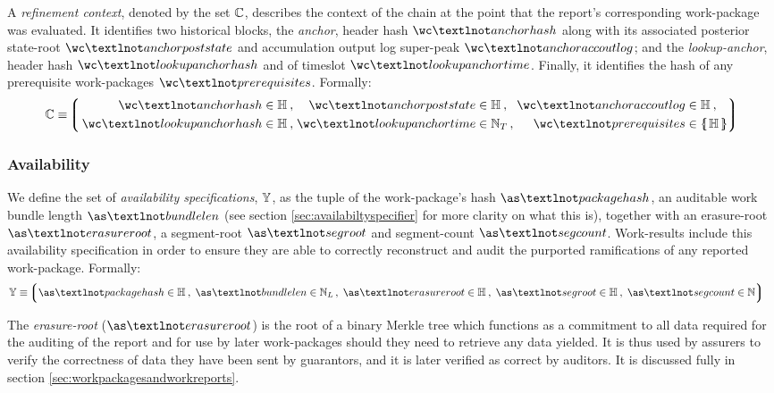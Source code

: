 A \emph{refinement context}, denoted by the set $\mathbb{C}$, describes the context of the chain at the point that the report's corresponding work-package was evaluated. It identifies two historical blocks, the \emph{anchor}, header hash $\wc¬anchorhash$ along with its associated posterior state-root $\wc¬anchorpoststate$ and accumulation output log super-peak $\wc¬anchoraccoutlog$; and the \emph{lookup-anchor}, header hash $\wc¬lookupanchorhash$ and of timeslot $\wc¬lookupanchortime$. Finally, it identifies the hash of any prerequisite work-packages $\wc¬prerequisites$. Formally:
\begin{equation}
  \workcontext \equiv \tuple{\,\begin{alignedat}{5}
    \isa{\wc¬anchorhash&}{\hash}\,,\;
    \isa{&\wc¬anchorpoststate&}{\hash}\,,\;
    \isa{&\wc¬anchoraccoutlog&}{\hash}\,,\;\\
    \isa{\wc¬lookupanchorhash&}{\hash}\,,\;
    \isa{&\wc¬lookupanchortime&}{\timeslot}\,,\;
    \isa{&\wc¬prerequisites&}{\protoset{\hash}}
  \end{alignedat}}
\end{equation}

\subsubsection{Availability}
We define the set of \emph{availability specifications}, $\mathbb{Y}$, as the tuple of the work-package's hash $\as¬packagehash$, an auditable work bundle length $\as¬bundlelen$ (see section \ref{sec:availabiltyspecifier} for more clarity on what this is), together with an erasure-root $\as¬erasureroot$, a segment-root $\as¬segroot$ and segment-count $\as¬segcount$. Work-results include this availability specification in order to ensure they are able to correctly reconstruct and audit the purported ramifications of any reported work-package. Formally:
\begin{align}
  \avspec &\equiv \tuple{
    \isa{\as¬packagehash}{\hash}\,,\;
    \isa{\as¬bundlelen}{\bloblength}\,,\;
    \isa{\as¬erasureroot}{\hash}\,,\;
    \isa{\as¬segroot}{\hash}\,,\;
    \isa{\as¬segcount}{\N}
  }
\end{align}

The \emph{erasure-root} ($\as¬erasureroot$) is the root of a binary Merkle tree which functions as a commitment to all data required for the auditing of the report and for use by later work-packages should they need to retrieve any data yielded. It is thus used by assurers to verify the correctness of data they have been sent by guarantors, and it is later verified as correct by auditors. It is discussed fully in section \ref{sec:workpackagesandworkreports}.

